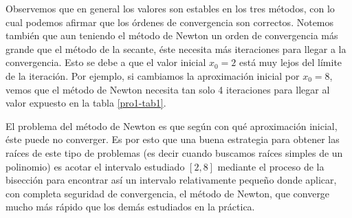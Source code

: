\documentclass[a4paper]{article}
\begin{document}
Observemos que en general los valores son estables en los tres métodos, con lo cual podemos afirmar que los órdenes de convergencia son correctos. Notemos también que aun teniendo el método de Newton un orden de convergencia más grande que el método de la secante, éste necesita más iteraciones para llegar a la convergencia. Esto se debe a que el valor inicial $x_0=2$ está muy lejos del límite de la iteración. Por ejemplo, si cambiamos la aproximación inicial por $x_0=8$, vemos que el método de Newton necesita tan solo 4 iteraciones para llegar al valor expuesto en la tabla \ref{pro1-tab1}.\par
El problema del método de Newton es que según con qué aproximación inicial, éste puede no converger. Es por esto que una buena estrategia para obtener las raíces de este tipo de problemas (es decir cuando buscamos raíces simples de un polinomio) es acotar el intervalo estudiado $[2,8]$ mediante el proceso de la bisección para encontrar así un intervalo relativamente pequeño donde aplicar, con completa seguridad de convergencia, el método de Newton, que converge mucho más rápido que los demás estudiados en la práctica.
\newpage
\end{document}
